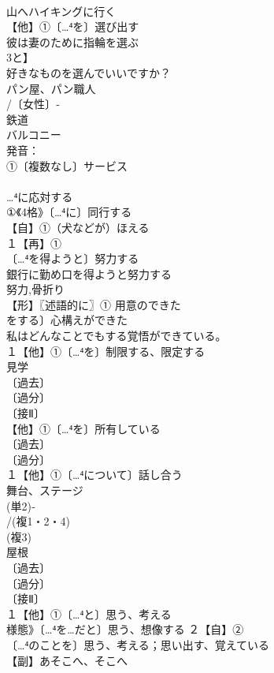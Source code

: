 \documentclass[8pt]{extreport}
\begin{document}
\begin{CJK}{UTF8}{min}
\\	山へハイキングに行く 
\\	【他】①〔…⁴を〕選び出す 
\\	彼は妻のために指輪を選ぶ 
\\	3と】
\\	好きなものを選んでいいですか？
\\	パン屋、パン職人 
\\	/〔女性〕‐
\\	鉄道
\\	バルコニー 
\\	発音：
\\	①〔複数なし〕サービス 
\\	[派生] 
\\	…⁴に応対する
\\	①《4格》〔…⁴に〕同行する 
\\	【自】①（犬などが）ほえる 
\\	１【再】①
\\	〔…⁴を得ようと〕努力する 
\\	銀行に勤め口を得ようと努力する 
\\	努力,骨折り
\\	【形】〖述語的に〗① 用意のできた
\\	をする〕心構えができた 
\\	私はどんなことでもする覚悟ができている。
\\	１【他】①〔…⁴を〕制限する、限定する 
\\	見学
\\	〔過去〕
\\	〔過分〕
\\	〔接Ⅱ〕
\\	【他】①〔…⁴を〕所有している 
\\	〔過去〕
\\	〔過分〕
\\	１【他】①〔…⁴について〕話し合う 
\\	舞台、ステージ 
\\	(単2)‐
\\	/(複1・2・4)
\\	(複3)
\\	屋根 
\\	〔過去〕
\\	〔過分〕
\\	〔接Ⅱ〕
\\	１【他】①〔…⁴と〕思う、考える 
\\	様態》〔…⁴を…だと〕思う、想像する ２【自】②
\\	〔…⁴のことを〕思う、考える；思い出す、覚えている
\\	【副】あそこへ、そこへ

\end{CJK}
\end{document}
